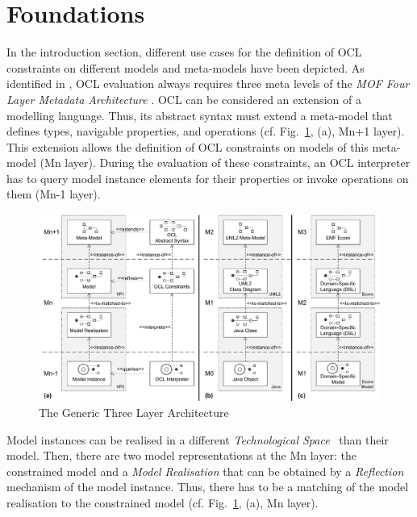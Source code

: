 \section{Foundations}
\label{sec:foundation}

In the introduction section, different use cases for the definition of OCL constraints on different
models and meta-models have been depicted. As identified in \cite{demuthRGWS09}, OCL evaluation
always requires three meta levels of the \emph{MOF Four Layer Metadata Architecture} \cite{spec:MOF1-4}. OCL can 
be considered an extension of a modelling language. Thus, its
abstract syntax must extend a meta-model that defines types, navigable properties, and operations
(cf. Fig.~\ref{fig:genericlayers}, (a), Mn+1 layer). This extension allows the definition of
OCL constraints on models of this meta-model (Mn layer). 
During the evaluation of these constraints, an OCL interpreter has to query model
instance elements for their properties or invoke operations on them (Mn-1 layer). 

	\begin{figure}[t]
			\centering
				\includegraphics[width=1.00\textwidth]{figures/genericlayers.pdf}
			\caption{The Generic Three Layer Architecture}
			\label{fig:genericlayers}
		\end{figure}

Model instances can be realised in
a different \emph{Technological Space}~\cite{kurtev2002technological} than their model. Then, there are two model
representations at the Mn layer: the constrained model and a \emph{Model Realisation} that can be obtained by a
\emph{Reflection} \cite{smith1982procedural} mechanism of the 
model instance. Thus, there has to be a matching of the model realisation to the constrained model (cf. Fig.~\ref{fig:genericlayers}, (a), Mn layer).

